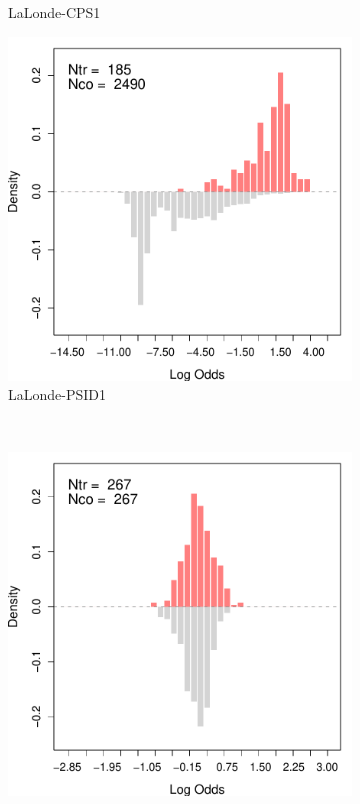 \documentclass[letterpaper,12pt,leqno]{article}
\begin{document}
\begin{figure}[!ht]
\begin{minipage}[c]{.65\textwidth}
\begin{subfigure}{0.45\linewidth}
            \caption{LaLonde-CPS1}
        \end{subfigure}
        \begin{subfigure}{0.45\linewidth}
            \includegraphics[width=\linewidth]{odds_nsw_psid.pdf}
            \caption{LaLonde-PSID1}
        \end{subfigure}\\
        \begin{subfigure}{0.45\linewidth}
            \includegraphics[width=\linewidth]{odds_nsw_cps_trim.pdf}

\end{subfigure}
\end{minipage}
\end{figure}
\end{document}
